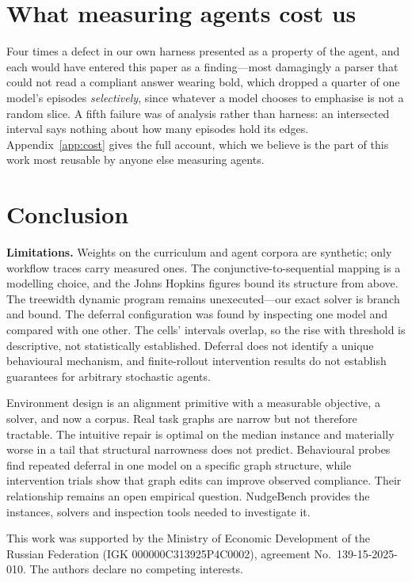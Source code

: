 \documentclass{article}
\begin{document}
\section{What measuring agents cost us}
\label{sec:cost}

Four times a defect in our own harness presented as a property of the agent, and
each would have entered this paper as a finding---most damagingly a parser that
could not read a compliant answer wearing bold, which dropped a quarter of one
model's episodes \emph{selectively}, since whatever a model chooses to emphasise is
not a random slice. A fifth failure was of analysis rather than harness: an
intersected interval says nothing about how many episodes hold its edges.
Appendix~\ref{app:cost} gives the full account, which we believe is the part of this
work most reusable by anyone else measuring agents.

\section{Conclusion}

\textbf{Limitations.} Weights on the curriculum and agent corpora are synthetic;
only workflow traces carry measured ones. The conjunctive-to-sequential mapping is a
modelling choice, and the Johns Hopkins figures bound its structure from above. The
treewidth dynamic program remains unexecuted---our exact solver is branch and bound.
The deferral configuration was found by inspecting one model and compared with one
other. The cells' intervals overlap, so the rise with threshold is descriptive, not
statistically established. Deferral does not identify a unique behavioural
mechanism, and finite-rollout intervention results do not establish guarantees for
arbitrary stochastic agents.

Environment design is an alignment primitive with a measurable objective, a solver,
and now a corpus. Real task graphs are narrow but not therefore tractable. The
intuitive repair is optimal on the median instance and materially worse in a tail
that structural narrowness does not predict. Behavioural probes find repeated
deferral in one model on a specific graph structure, while intervention trials show
that graph edits can improve observed compliance. Their relationship remains an
open empirical question. NudgeBench provides the instances, solvers and inspection
tools needed to investigate it.

\begin{ack}
This work was supported by the Ministry of Economic Development of the Russian Federation (IGK 000000C313925P4C0002), agreement No.~139-15-2025-010.
The authors declare no competing interests.
\end{ack}
\end{document}
